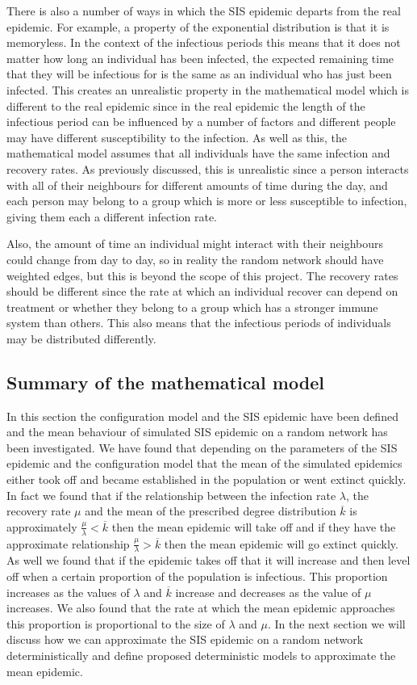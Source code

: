 \documentclass{uonmathsreport}
\begin{document}
There is also a number of ways in which the SIS epidemic departs from the real epidemic. For example, a property of the exponential distribution is that it is memoryless. In the context of the infectious periods this means that it does not matter how long an individual has been infected, the expected remaining time that they will be infectious for is the same as an individual who has just been infected. This creates an unrealistic property in the mathematical model which is different to the real epidemic since in the real epidemic the length of the infectious period can be influenced by a number of factors and different people may have different susceptibility to the infection. As well as this, the mathematical model assumes that all individuals have the same infection and recovery rates. As previously discussed, this is unrealistic since a person interacts with all of their neighbours for different amounts of time during the day, and each person may belong to a group which is more or less susceptible to infection, giving them each a different infection rate. 

Also, the amount of time an individual might interact with their neighbours could change from day to day, so in reality the random network should have weighted edges, but this is beyond the scope of this project. The recovery rates should be different since the rate at which an individual recover can depend on treatment or whether they belong to a group which has a stronger immune system than others. This also means that the infectious periods of individuals may be distributed differently.

\subsection{Summary of the mathematical model} \label{subsub:5.7}

In this section the configuration model and the SIS epidemic have been defined and the mean behaviour of simulated SIS epidemic on a random network has been investigated. We have found that depending on the parameters of the SIS epidemic and the configuration model that the mean of the simulated epidemics either took off and became established in the population or went extinct quickly. In fact we found that if the relationship between the infection rate $\lambda$, the recovery rate $\mu$ and the mean of the prescribed degree distribution $\overline{k}$ is approximately $\frac{\mu}{\lambda}<\overline{k}$ then the mean epidemic will take off and if they have the approximate relationship $\frac{\mu}{\lambda}>\overline{k}$ then the mean epidemic will go extinct quickly. As well we found that if the epidemic takes off that it will increase and then level off when a certain proportion of the population is infectious. This proportion increases as the values of $\lambda$ and $\overline{k}$ increase and decreases as the value of $\mu$ increases. We also found that the rate at which the mean epidemic approaches this proportion is proportional to the size of $\lambda$ and $\mu$. In the next section we will discuss how we can approximate the SIS epidemic on a random network deterministically and define proposed deterministic models to approximate the mean epidemic.
\end{document}
